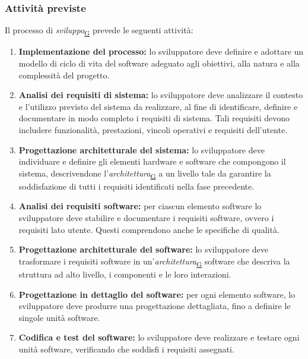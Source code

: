 \documentclass[a4paper,12pt]{article}
\begin{document}
{{        \subsubsection{Attività previste}{
            Il processo di \textit{sviluppo}\textsubscript{\href{https://atlasteam9.github.io/Atlas/glossario.html\#Sviluppo}{G}} prevede le seguenti attività:
            \begin{enumerate}
                \item \textbf{Implementazione del processo:} lo sviluppatore deve definire e adottare un modello di ciclo di vita del software adeguato agli obiettivi, alla natura e alla complessità del progetto.
                \item \textbf{Analisi dei requisiti di sistema:} lo sviluppatore deve analizzare il contesto e l'utilizzo previsto del sistema da realizzare, al fine di identificare, definire e documentare in modo completo i requisiti di sistema. Tali requisiti devono includere funzionalità, prestazioni, vincoli operativi e requisiti dell'utente.
                \item \textbf{Progettazione architetturale del sistema:} lo sviluppatore deve individuare e definire gli elementi hardware e software che compongono il sistema, descrivendone l'\textit{architettura}\textsubscript{\href{https://atlasteam9.github.io/Atlas/glossario.html\#Architettura}{G}} a un livello tale da garantire la soddisfazione di tutti i requisiti identificati nella fase precedente.
                \item \textbf{Analisi dei requisiti software:} per ciascun elemento software lo sviluppatore deve stabilire e documentare i requisiti software, ovvero i requisiti lato utente. Questi comprendono anche le specifiche di qualità.
                \item \textbf{Progettazione architetturale del software:} lo sviluppatore deve trasformare i requisiti software in un'\textit{architettura}\textsubscript{\href{https://atlasteam9.github.io/Atlas/glossario.html\#Architettura}{G}} software che descriva la struttura ad alto livello, i componenti e le loro interazioni.
                \item \textbf{Progettazione in dettaglio del software:} per ogni elemento software, lo sviluppatore deve produrre una progettazione dettagliata, fino a definire le singole unità software.
                \item \textbf{Codifica e test del software:} lo sviluppatore deve realizzare e testare ogni unità software, verificando che soddisfi i requisiti assegnati.

\end{enumerate}}}}
\end{document}

